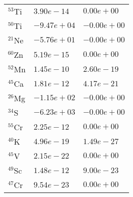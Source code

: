 \begin{tabular}{lll}
 $^{53}$Ti & $3.90e-14 $                                                        & $0.00e+00 $                                                                     \\
 $^{50}$Ti & $-9.47e+04 $                                                       & $-0.00e+00 $                                                                    \\
 $^{21}$Ne & $-5.76e+01 $                                                       & $-0.00e+00 $                                                                    \\
 $^{60}$Zn & $5.19e-15 $                                                        & $0.00e+00 $                                                                     \\
 $^{52}$Mn & $1.45e-10 $                                                        & $2.60e-19 $                                                                     \\
 $^{45}$Ca & $1.81e-12 $                                                        & $4.17e-21 $                                                                     \\
 $^{26}$Mg & $-1.15e+02 $                                                       & $-0.00e+00 $                                                                    \\
 $^{34}$S  & $-6.23e+03 $                                                       & $-0.00e+00 $                                                                    \\
 $^{55}$Cr & $2.25e-12 $                                                        & $0.00e+00 $                                                                     \\
 $^{40}$K  & $4.96e-19 $                                                        & $1.49e-27 $                                                                     \\
 $^{45}$V  & $2.15e-22 $                                                        & $0.00e+00 $                                                                     \\
 $^{49}$Sc & $1.48e-12 $                                                        & $9.00e-23 $                                                                     \\
 $^{47}$Cr & $9.54e-23 $                                                        & $0.00e+00 $                                                                     \\

\end{tabular}
